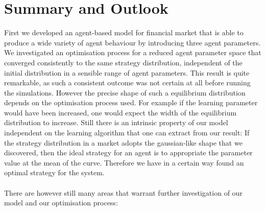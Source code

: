 \documentclass[11pt]{article}
\begin{document}
\section{Summary and Outlook}
First we developed an agent-based model for financial market that is able to produce a wide variety of agent behaviour by introducing three agent parameters. We investigated an optimisation process for a reduced agent parameter space that converged consistently to the same strategy distribution, independent of the initial distribution in a sensible range of agent parameters. This result is quite remarkable, as such a consistent outcome was not certain at all before running the simulations. However the precise shape of such a equilibrium distribution depends on the optimisation process used. For example if the learning parameter would have been increased, one would expect the width of the equilibrium distribution to increase. Still there is an intrinsic property of our model independent on the learning algorithm that one can extract from our result: If the strategy distribution in a market adopts the gaussian-like shape that we discovered, then the ideal strategy for an agent is to appropriate the parameter value at the mean of the curve. Therefore we have in a certain way found an optimal strategy for the system. \\
\hfill \\
There are however still many areas that warrant further investigation of our model and our optimisation process:
\end{document}
